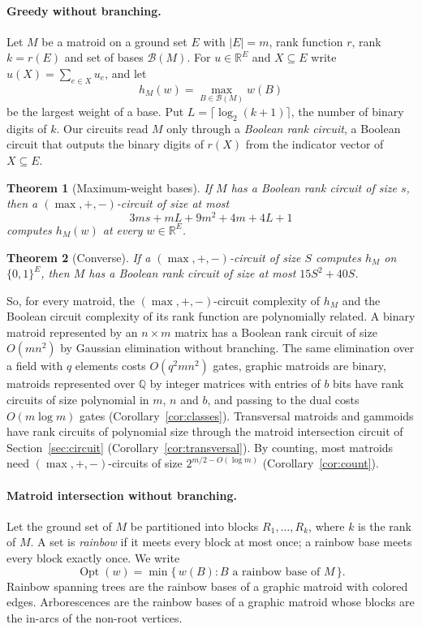\documentclass[11pt]{article}
\newtheorem{mainthm}{Theorem}
\newcommand{\R}{\mathbb R}
\newcommand{\Opt}{\operatorname{Opt}}
\newcommand{\Bases}{\mathcal B}
\begin{document}
\paragraph{Greedy without branching.}
Let $M$ be a matroid on a ground set $E$ with $|E|=m$, rank function $r$,
rank $k=r(E)$ and set of bases $\Bases(M)$.  For $u\in\R^{E}$ and $X\subseteq E$
write $u(X)=\sum_{e\in X}u_e$, and let
\[
  h_M(w)=\max_{B\in\Bases(M)}w(B)
\]
be the largest weight of a base.  Put $L=\lceil\log_2(k+1)\rceil$, the number
of binary digits of $k$.  Our circuits read $M$ only through a \emph{Boolean rank
circuit}, a Boolean circuit that outputs the binary digits of $r(X)$ from the
indicator vector of $X\subseteq E$.

\begin{mainthm}[Maximum-weight bases]
\label{thm:A}
If $M$ has a Boolean rank circuit of size $s$, then a $(\max,+,-)$-circuit of
size at most
\[
  3ms+mL+9m^{2}+4m+4L+1
\]
computes $h_M(w)$ at every $w\in\R^{E}$.
\end{mainthm}

\begin{mainthm}[Converse]
\label{thm:B}
If a $(\max,+,-)$-circuit of size $S$ computes $h_M$ on $\{0,1\}^{E}$, then $M$
has a Boolean rank circuit of size at most $15S^{2}+40S$.
\end{mainthm}

So, for every matroid, the $(\max,+,-)$-circuit complexity of $h_M$ and the
Boolean circuit complexity of its rank function are polynomially related.  A
binary matroid represented by an
$n\times m$ matrix has a Boolean rank circuit of size $O(mn^{2})$ by Gaussian
elimination without branching.  The same elimination over a field with $q$
elements costs $O(q^{2}mn^{2})$ gates, graphic matroids are binary, matroids
represented over $\mathbb Q$ by integer matrices with entries of $b$ bits have
rank circuits of size polynomial in $m$, $n$ and $b$, and passing to the dual
costs $O(m\log m)$ gates (Corollary~\ref{cor:classes}).  Transversal matroids
and gammoids have rank circuits of polynomial size through the matroid
intersection circuit of Section~\ref{sec:circuit}
(Corollary~\ref{cor:transversal}).
By counting, most matroids need $(\max,+,-)$-circuits of size $2^{m/2-O(\log m)}$
(Corollary~\ref{cor:count}).

\paragraph{Matroid intersection without branching.}
Let the ground set of $M$ be partitioned into blocks $R_1,\ldots,R_k$, where $k$
is the rank of $M$.  A set is \emph{rainbow} if it meets every block at most
once; a rainbow base meets every block exactly once.  We write
\[
  \Opt(w)=\min\{\,w(B):B\text{ a rainbow base of }M\,\}.
\]
Rainbow spanning trees are the rainbow bases of a graphic matroid with colored
edges.  Arborescences are the rainbow bases of a graphic matroid whose blocks are
the in-arcs of the non-root vertices.
\end{document}
